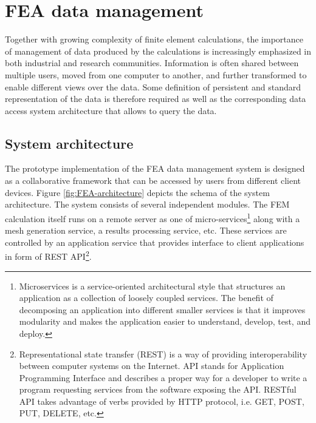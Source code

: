 \chapter{FEA data management}
\label{chapter:data-management}

Together with growing complexity of finite element calculations, the importance of management of data produced by the calculations is increasingly emphasized in both industrial and research communities. Information is often shared between multiple users, moved from one computer to another, and further transformed to enable different views over the data. Some definition of persistent and standard representation of the data is therefore required as well as the corresponding data access system architecture that allows to query the data.

\section{System architecture}
\label{sec:system-architecture}

The prototype implementation of the FEA data management system is designed as a collaborative framework that can be accessed by users from different client devices. Figure \ref{fig:FEA-architecture} depicts the schema of the system architecture. The system consists of several independent modules. The FEM calculation itself runs on a remote server as one of micro-services\footnote{Microservices is a service-oriented architectural style that structures an application as a collection of loosely coupled services. The benefit of decomposing an application into different smaller services is that it improves modularity and makes the application easier to understand, develop, test, and deploy.} along with a mesh generation service, a results processing service, etc. These services are controlled by an application service that provides interface to client applications in form of REST API\footnote{Representational state transfer (REST) is a way of providing interoperability between computer systems on the Internet. API stands for Application Programming Interface and describes a proper way for a developer to write a program requesting services from the software exposing the API. RESTful API takes advantage of verbs provided by HTTP protocol, i.e. GET, POST, PUT, DELETE, etc.}.

